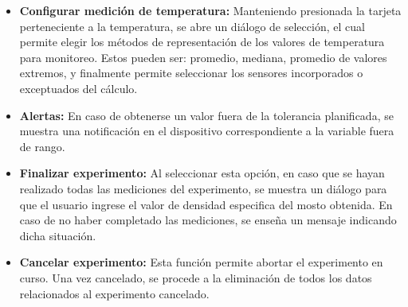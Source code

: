                 \begin{itemize}
                    \item \textbf {Configurar medición de temperatura:} Manteniendo presionada la tarjeta perteneciente a la temperatura, se abre un diálogo de selección, el cual permite elegir los métodos de representación de los valores de temperatura para monitoreo. Estos pueden ser: promedio, mediana, promedio de valores extremos, y finalmente permite seleccionar los sensores incorporados o exceptuados del cálculo.
                    
                    \item \textbf{Alertas:} En caso de obtenerse un valor fuera de la tolerancia planificada, se muestra una notificación en el dispositivo correspondiente a la variable fuera de rango. 
                    \item \textbf{Finalizar experimento:} Al seleccionar esta opción, en caso que se hayan realizado todas las mediciones del experimento, se muestra un diálogo para que el usuario ingrese el valor de densidad especifica del mosto obtenida. En caso de no haber completado las mediciones, se enseña un mensaje indicando dicha situación.
            
                    \item \textbf{Cancelar experimento:} Esta función permite abortar el experimento en curso. Una vez cancelado, se procede a la eliminación de todos los datos relacionados al experimento cancelado.
                \end{itemize}
            
